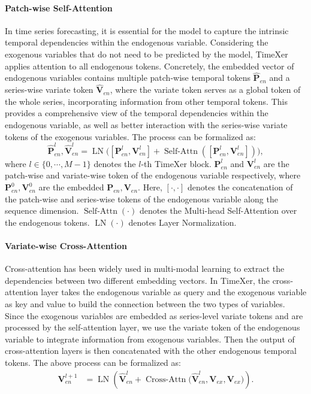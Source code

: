 \documentclass[nohyperref]{article}
\theoremstyle{plain}
\theoremstyle{definition}
\theoremstyle{remark}
\begin{document}
\paragraph{Patch-wise Self-Attention}
In time series forecasting, it is essential for the model to capture the intrinsic temporal dependencies within the endogenous variable. Considering the exogenous variables that do not need to be predicted by the model, TimeXer applies attention to all endogenous tokens.
Concretely, the embedded vector of endogenous variables contains multiple patch-wise temporal tokens $\mathbf{\widehat P}_{en}$ and a series-wise variate token $\mathbf{\widehat V}_{en}$, where the variate token serves as a global token of the whole series, incorporating information from other temporal tokens. This provides a comprehensive view of the temporal dependencies within the endogenous variable, as well as better interaction with the series-wise variate tokens of the exogenous variables. The process can be formalized as:
\begin{equation}
    \mathbf{\widehat P}^l_{en}, \mathbf{\widehat V}^l_{en} = \operatorname{LN} \Big(\left[\mathbf{P}^l_{en}, \mathbf{V}^l_{en}\right] + \operatorname{Self-Attn}\left(\left[\mathbf{P}^l_{en}, \mathbf{V}^l_{en}\right]\right)\Big),
\end{equation}
where $l \in \{0,\cdots, M-1\}$ denotes the $l$-th TimeXer block.  $\mathbf{P}^l_{en}$ and $\mathbf{V}^l_{en}$ are the patch-wise and variate-wise token of the endogenous variable respectively, where $\mathbf{P}^0_{en}, \mathbf{V}^0_{en}$ are the embedded $\mathbf{P}_{en}, \mathbf{V}_{en}$. Here, $\left[ \cdot,\cdot\right]$ denotes the concatenation of the patch-wise and series-wise tokens of the endogenous variable along the sequence dimension. $\operatorname{Self-Attn}(\cdot)$ denotes the Multi-head Self-Attention over the endogenous tokens. $\operatorname{LN} (\cdot)$ denotes Layer Normalization.

\paragraph{Variate-wise Cross-Attention} Cross-attention has been widely used in multi-modal learning \cite{li2021align} to extract the dependencies between two different embedding vectors. In TimeXer, the cross-attention layer takes the endogenous variable as query and the exogenous variable as key and value to build the connection between the two types of variables. Since the exogenous variables are embedded as series-level variate tokens and are processed by the self-attention layer, we use the variate token of the endogenous variable to integrate information from exogenous variables. Then the output of cross-attention layers is then concatenated with the other endogenous temporal tokens. The above process can be formalized as:
\begin{equation}
    \begin{aligned}
        \mathbf{V}^{l+1}_{en} &= \operatorname{LN}\left(\mathbf{\widehat{V}}^{l}_{en} + \operatorname{Cross-Attn}\big(\mathbf{\widehat{V}}^{l}_{en}, \mathbf{V}_{ex}, \mathbf{V}_{ex}\big)\right).
    \end{aligned}
\end{equation}
\end{document}
